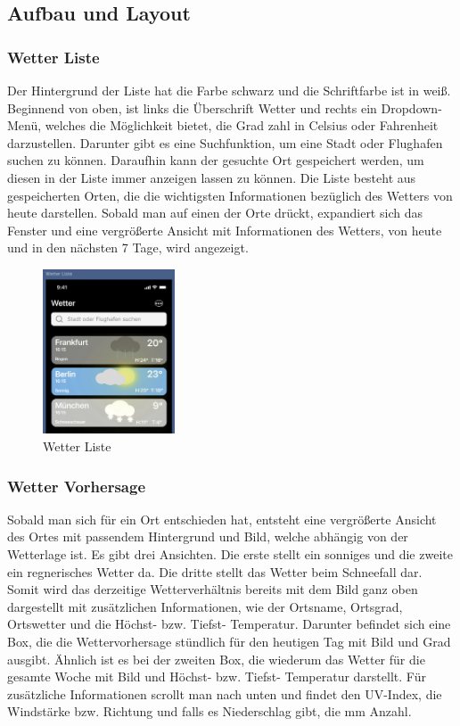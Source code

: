 \documentclass{article}
\begin{document}
\subsection{Aufbau und Layout}
\subsubsection{Wetter Liste}
Der Hintergrund der Liste hat die Farbe schwarz und die Schriftfarbe ist in weiß. Beginnend von oben, ist links die Überschrift Wetter und rechts ein Dropdown-Menü, welches die Möglichkeit bietet, die Grad zahl in Celsius oder Fahrenheit darzustellen. Darunter gibt es eine Suchfunktion, um eine Stadt oder Flughafen suchen zu können. Daraufhin kann der gesuchte Ort gespeichert werden, um diesen in der Liste immer anzeigen lassen zu können. Die Liste besteht aus gespeicherten Orten, die die wichtigsten Informationen bezüglich des Wetters von heute darstellen. Sobald man auf einen der Orte drückt, expandiert sich das Fenster und eine vergrößerte Ansicht mit Informationen des Wetters, von heute und in den nächsten 7 Tage, wird angezeigt. 

\begin{figure}[H]
\centering
\includegraphics[width=0.35\textwidth]{wetterliste.png}
\caption{Wetter Liste}
\end{figure}

\subsubsection{Wetter Vorhersage}
Sobald man sich für ein Ort entschieden hat, entsteht eine vergrößerte Ansicht des Ortes mit passendem Hintergrund und Bild, welche abhängig von der Wetterlage ist. Es gibt drei Ansichten. Die erste stellt ein sonniges und die zweite ein regnerisches Wetter da. Die dritte stellt das Wetter beim Schneefall dar. Somit wird das derzeitige Wetterverhältnis bereits mit dem Bild ganz oben dargestellt mit zusätzlichen Informationen, wie der Ortsname, Ortsgrad, Ortswetter und die Höchst- bzw. Tiefst- Temperatur. Darunter befindet sich eine Box, die die Wettervorhersage stündlich für den heutigen Tag mit Bild und Grad ausgibt. Ähnlich ist es bei der zweiten Box, die wiederum das Wetter für die gesamte Woche mit Bild und Höchst- bzw. Tiefst- Temperatur darstellt. Für zusätzliche Informationen scrollt man nach unten und findet den UV-Index, die Windstärke bzw. Richtung und falls es Niederschlag gibt, die mm Anzahl.
\end{document}
